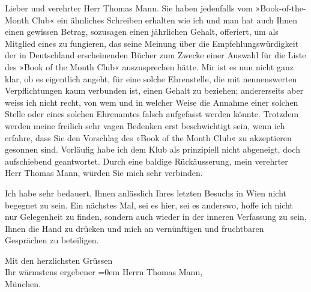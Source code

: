\pstart{}Lieber und verehrter Herr Thomas Mann.\pend\vspace{0.5em}
\pstart
           Sie haben jedenfalls vom »Book-of-the-Month Club«
               ein ähnliches Schreiben erhalten wie ich und man hat auch Ihnen einen gewissen
               Betrag, sozusagen einen jährlichen Gehalt, offeriert, um als Mitglied eines \label{T_L02507-1v}\label{T_L02507-1}
               zu fungieren, das seine Meinung über die Empfehlungswürdigkeit der in Deutschland erscheinenden Bücher zum Zwecke einer
               Auswahl für die Liste des »Book of the Month
               Club« auszusprechen hätte. Mir ist es nun nicht ganz klar, ob es eigentlich
               angeht, für eine solche Ehrenstelle, die mit nennenswerten Verpflichtungen kaum
               verbunden ist, einen Gehalt zu beziehen; andererseits aber weiss ich nicht recht, von
               wem und in welcher Weise die Annahme einer solchen Stelle oder eines solchen
               Ehrenamtes falsch aufgefasst werden könnte. Trotzdem werden meine freilich sehr vagen
               Bedenken erst beschwichtigt sein, wenn ich erfahre, dass Sie den Vorschlag des »Book of the Month Club« zu akzeptieren gesonnen
               sind. Vorläufig habe ich dem Klub als prinzipiell nicht abgeneigt, doch aufschiebend
               geantwortet. Durch eine baldige Rückäusserung, mein verehrter Herr Thomas Mann,
               würden Sie mich sehr verbinden.\pend
           
\pstart
           Ich habe sehr bedauert\introOben{},\introOben{} Ihnen anlässlich Ihres letzten
               Besuchs in Wien nicht begegnet zu sein. Ein
               nächstes Mal, sei es hier, sei es anderswo, hoffe ich nicht nur Gelegenheit zu finden, sondern auch  wieder in der inneren Verfassung zu sein\introOben{},\introOben{}
               Ihnen die Hand zu drücken und mich an vernünftigen und fruchtbaren Gesprächen zu
               beteiligen.\pend
           
\pstart
           Mit den herzlichsten Grüssen{\\[\baselineskip]}Ihr wärmstens ergebener\pend
           \leftskip=0em{}{\vspace{1\baselineskip}}
\pstart
           \noindent{}Herrn Thomas Mann,{\\}München.\pend
           \endnumbering{}  
      